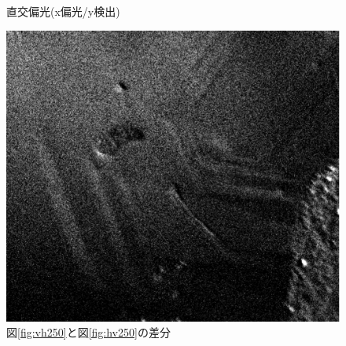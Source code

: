 \documentclass[11pt,a4paper]{jsarticle}
\begin{document}
\begin{figure}[htbp]
\begin{minipage}{0.333\hsize}
\begin{center}
  \end{center}
  \caption{直交偏光(x偏光/y検出)}
  \label{fig:hv250}
 \end{minipage}
 \begin{minipage}{0.333\hsize}
  \begin{center}
   \includegraphics[width=\hsize]{vh250_subtractedby_hv250.eps}
  \end{center}
  \caption{図\ref{fig:vh250}と図\ref{fig:hv250}の差分}
  \label{fig:vh250_subtractedby_hv250}
 \end{minipage}
\end{figure}
\end{document}
